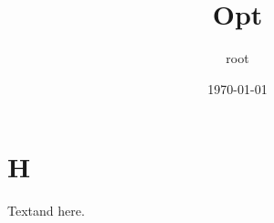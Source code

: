 \documentclass[11pt]{article}
\author{root}
\date{\today}
\title{Opt}
\begin{document}
\maketitle
\section{H}
\label{sec:org43e0689}
Textand here.
\end{document}
